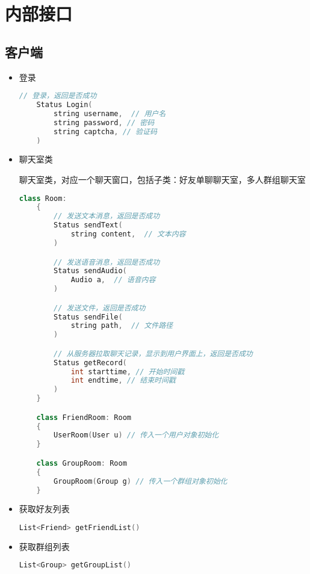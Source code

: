 {\color{red}
\section{内部接口}
\subsection{客户端}
\begin{itemize}
    \item 登录
    \begin{lstlisting}[language=c++]
    // 登录，返回是否成功
    Status Login(
        string username,  // 用户名
        string password, // 密码
        string captcha, // 验证码
    )
    \end{lstlisting}

    \item 聊天室类

    聊天室类，对应一个聊天窗口，包括子类：好友单聊聊天室，多人群组聊天室
    \begin{lstlisting}[language=c++]
    class Room:
    {
        // 发送文本消息，返回是否成功
        Status sendText(
            string content,  // 文本内容
        )

        // 发送语音消息，返回是否成功
        Status sendAudio(
            Audio a,  // 语音内容
        )

        // 发送文件，返回是否成功
        Status sendFile(
            string path,  // 文件路径
        )

        // 从服务器拉取聊天记录，显示到用户界面上，返回是否成功
        Status getRecord(
            int starttime, // 开始时间戳
            int endtime, // 结束时间戳
        )
    }

    class FriendRoom: Room
    {
        UserRoom(User u) // 传入一个用户对象初始化
    }

    class GroupRoom: Room
    {
        GroupRoom(Group g) // 传入一个群组对象初始化
    }

    \end{lstlisting}

    \item 获取好友列表
    \begin{lstlisting}[language=c++]
    List<Friend> getFriendList()
    \end{lstlisting}

    \item 获取群组列表
    \begin{lstlisting}[language=c++]
    List<Group> getGroupList()
    \end{lstlisting}


\end{itemize}}
